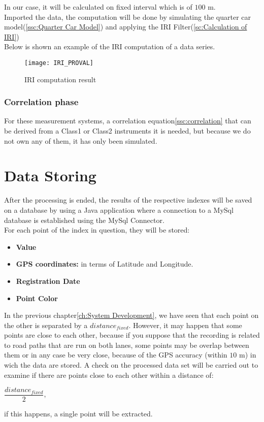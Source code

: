 \documentclass[tesi]{subfiles}
\begin{document}
\noindent In our case, it will be calculated on fixed interval which is of $100$ $\si{\meter}$.\\

\noindent Imported the data, the computation will be done by simulating the quarter car model(\ref{ssc:Quarter Car Model}) and applying the IRI Filter(\ref{sc:Calculation of IRI})\\

\noindent Below is shown an example of the IRI computation of a data series.
\begin{figure}[H]
\centering
\texttt{[image: IRI\_PROVAL]}
\caption{IRI computation result}
\end{figure}\label{fig:IRI computation result}


\subsubsection{Correlation phase}
For these measurement systems, a correlation equation\ref{ssc:correlation} that can be derived from a Class1 or Class2 instruments it is needed, but because we do not own any of them, it has only been simulated.


\section{Data Storing}\label{sc:data_storing}
After the processing is ended, the results of the respective indexes will be saved on a database by using a Java application where a connection to a MySql database is established using the MySql Connector.\\
For each point of the index in question, they will be stored:
\begin{itemize}
\item \textbf{Value}
\item \textbf{GPS coordinates:} in terms of Latitude and Longitude.
\item \textbf{Registration Date}
\item \textbf{Point Color}
\end{itemize}

\noindent In the previous chapter\ref{ch:System Development}, we have seen that each point on the other is separated by a $distance_{fixed}$. However, it may happen that some points are close to each other, because if you suppose that the recording is related to road paths that are run on both lanes, some points may be overlap between them or in any case be very close, because of the GPS accuracy (within $10$ m) in wich the data are stored. A check on the processed data set will be carried out to examine if there are points close to each other within a distance of:  
\begin{center}
$\dfrac{distance_{fixed}}{2}$,
\end{center} 
\noindent if this happens, a single point will be extracted.\\
\end{document}
